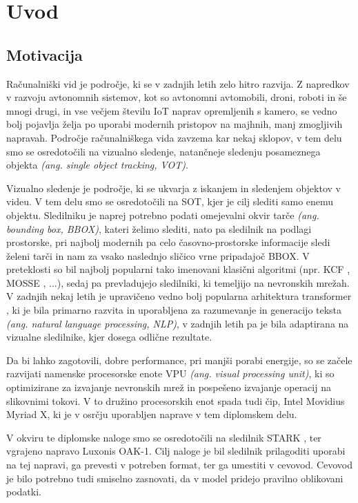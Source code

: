 \documentclass[a4paper,12pt,openright]{book}
\begin{document}
\mainmatter
\setcounter{page}{1}
\pagestyle{fancy}

\chapter{Uvod}
\section{Motivacija}
Računalniški vid je področje, ki se v zadnjih letih zelo hitro razvija. Z napredkov v razvoju avtonomnih sistemov, kot so avtonomni avtomobili, droni, roboti in še mnogi drugi, in vse večjem številu IoT naprav opremljenih s kamero, se vedno bolj pojavlja želja po uporabi modernih pristopov na majhnih, manj zmogljivih napravah. Področje računalniškega vida zavzema kar nekaj sklopov, v tem delu smo se osredotočili na vizualno sledenje, natančneje sledenju posameznega objekta \emph{(ang. single object tracking, VOT)}.

Vizualno sledenje je področje, ki se ukvarja z iskanjem in sledenjem objektov v videu. V tem delu smo se osredotočili na SOT, kjer je cilj slediti samo enemu objektu. Sledilniku je naprej potrebno podati omejevalni okvir tarče \emph{(ang. bounding box, BBOX)}, kateri želimo slediti, nato pa sledilnik na podlagi prostorske, pri najbolj modernih pa celo časovno-prostorske informacije sledi želeni tarči in nam za vsako naslednjo sličico vrne pripadajoč BBOX. V preteklosti so bil najbolj popularni tako imenovani klasični algoritmi (npr. KCF \cite{kcf}, MOSSE \cite{mosse}, ...), sedaj pa prevladujejo sledilniki, ki temeljijo na nevronskih mrežah. V zadnjih nekaj letih je upravičeno vedno bolj popularna arhitektura transformer \cite{attention_is_all_you_need}, ki je bila primarno razvita in uporabljena za razumevanje in generacijo teksta \emph{(ang. natural language processing, NLP)}, v zadnjih letih pa je bila adaptirana na vizualne sledilnike, kjer dosega odlične rezultate.

Da bi lahko zagotovili, dobre performance, pri manjši porabi energije, so se začele razvijati namenske procesorske enote VPU \emph{(ang. visual processing unit)}, ki so optimizirane za izvajanje nevronskih mrež in pospešeno izvajanje operacij na slikovnimi tokovi. V to družino procesorskih enot spada tudi čip, Intel Movidius Myriad X, ki je v osrčju uporabljen naprave v tem diplomskem delu.

V okviru te diplomske naloge smo se osredotočili na sledilnik STARK \cite{stark}, ter vgrajeno napravo Luxonis OAK-1. Cilj naloge je bil sledilnik prilagoditi uporabi na tej napravi, ga prevesti v potreben format, ter ga umestiti v cevovod. Cevovod je bilo potrebno tudi smiselno zasnovati, da v model pridejo pravilno oblikovani podatki.
\end{document}
